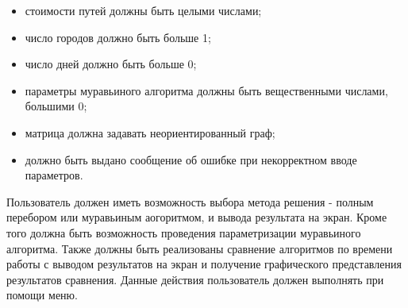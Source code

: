 \begin{itemize}
	\item стоимости путей должны быть целыми числами;
	\item число городов должно быть больше 1;
	\item число дней должно быть больше 0;
	\item параметры муравьиного алгоритма должны быть вещественными числами, большими 0;
	\item матрица должна задавать неориентированный граф;
	\item должно быть выдано сообщение об ошибке при некорректном вводе параметров.
\end{itemize}

Пользователь должен иметь возможность выбора метода решения - полным перебором или муравьиным аогоритмом, и вывода результата на экран. Кроме того должна быть возможность проведения параметризации муравьиного алгоритма. Также должны быть реализованы сравнение алгоритмов по времени работы с выводом результатов на экран и получение графического представления результатов сравнения. Данные действия пользователь должен выполнять при помощи меню.